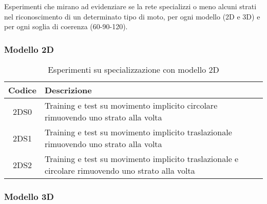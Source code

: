 Esperimenti che mirano ad evidenziare se la rete specializzi o meno alcuni strati nel riconoscimento di un determinato tipo di moto, per ogni modello (2D e 3D) e per ogni soglia di coerenza (60-90-120).

\subsubsection{Modello 2D}

\begin{table}[H]
	\begin{tabularx}{\textwidth}{|c|X|}
		\hline 
		\textbf{Codice} &
		\textbf{Descrizione} \\ 
		
		\hline 2DS0 &
		Training e test su movimento implicito circolare rimuovendo uno strato alla volta \\ 
		
		\hline 2DS1 &
		Training e test su movimento implicito traslazionale rimuovendo uno strato alla volta \\ 
		
		\hline 2DS2 & 
		Training e test su movimento implicito traslazionale e circolare rimuovendo uno strato alla volta \\ 
		\hline 
	\end{tabularx}
	\caption{Esperimenti su specializzazione con modello 2D}
	\label{esperimenti-specializzazione-2D}
\end{table}

\newpage

\subsubsection{Modello 3D}

